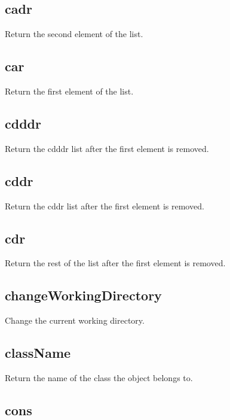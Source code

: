 \begin{itemize}
\subsection{cadr}

  Return the second element of the list.

\subsection{car}

  Return the first element of the list.

\subsection{cdddr}

  Return the cdddr list after the first element is removed.

\subsection{cddr}

  Return the cddr list after the first element is removed.

\subsection{cdr}

  Return the rest of the list after the first element is removed.

\subsection{changeWorkingDirectory}

  Change the current working directory.

\subsection{className}

  Return the name of the class the object belongs to.

\subsection{cons}


\end{itemize}
